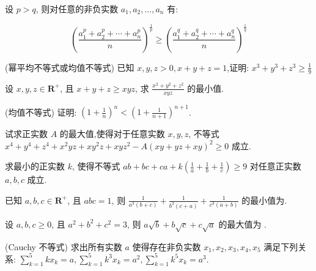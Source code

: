 \documentclass[a4paper , final]{ctexart}
\newenvironment{problem}[1]{%
  \item #1
  \par
  \vspace{8cm}
}{}
\begin{document}
设 $p>q$, 则对任意的非负实数 $a_1,a_2,\ldots,a_n$ 有:

\begin{equation*}
  \left(\frac{a_1^p+a_2^p+\cdots+a_n^p}{n}\right)^{\frac{1}{p}} \geq \left(\frac{a_1^q+a_2^q+\cdots+a_n^q}{n}\right)^{\frac{1}{q}}
\end{equation*}

\begin{problems}
  \begin{problem}
    {(幂平均不等式或均值不等式)
      已知 $x,y,z>0,x+y+z=1$,证明: $x^3+y^3+z^3\geq \frac{1}{9}$
    }
  \end{problem}

  \begin{problem}
    {
      设 $x,y,z\in\mathbf{R}^+$, 且 $x+y+z\ge xyz$, 求 $\frac{x^2+y^2+z^2}{xyz}$ 的最小值.
    }
  \end{problem}

  \begin{problem}
    {(均值不等式)
      证明: $\left(1+\frac{1}{n}\right)^n < \left(1+\frac{1}{n+1}\right)^{n+1}$.
    }
  \end{problem}

  \begin{problem}
    {
      试求正实数 $A$ 的最大值,使得对于任意实数 $x,y,z$, 不等式 $x^4+y^4+z^4+x^2yz+xy^2z+xyz^2-A(xy+yz+xy)^2\ge 0$ 成立.
    }
  \end{problem}

  \begin{problem}
    {
      求最小的正实数 $k$, 使得不等式 $ab+bc+ca+k\left(\frac{1}{a}+\frac{1}{b}+\frac{1}{c}\right)\geq 9$ 对任意正实数 $a,b,c$ 成立.
    }
  \end{problem}

  \begin{problem}
    {
      已知 $a,b,c\in \mathbf{R}^+$, 且 $abc=1$, 则 $\frac{1}{a^3(b+c)}+\frac{1}{b^3(c+a)}+\frac{1}{c^3(a+b)}$ 的最小值为\underline{\hspace{3cm}}.
    }
  \end{problem}

  \begin{problem}
    {
      设 $a,b,c\ge 0$, 且 $a^2+b^2+c^2=3$, 则 $a\sqrt{b}+b\sqrt{c}+c\sqrt{a}$ 的最大值为 \underline{\hspace{3cm}}.
    }
  \end{problem}

  \begin{problem}
    {(Cauchy 不等式)
      求出所有实数 $a$ 使得存在非负实数 $x_1,x_2,x_3,x_4,x_5$ 满足下列关系: $\sum_{k=1}^5 kx_k=a,\sum_{k=1}^5 k^3x_k =a^2,\sum_{k=1}^5 k^5x_k =a^3$.
    }
  \end{problem}


\end{problems}
\end{document}
